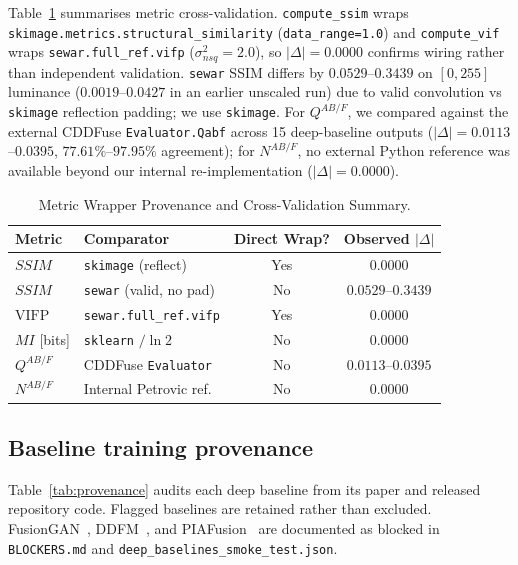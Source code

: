 \documentclass[conference]{IEEEtran}
\begin{document}
Table~\ref{tab:metrics_cv} summarises metric cross-validation. \texttt{compute\_ssim} wraps \texttt{skimage.metrics.structural\_similarity} (\texttt{data\_range=1.0}) and \texttt{compute\_vif} wraps \texttt{sewar.full\_ref.vifp} ($\sigma_{nsq}^2=2.0$), so $|\Delta|=0.0000$ confirms wiring rather than independent validation. \texttt{sewar} SSIM differs by $0.0529$--$0.3439$ on $[0,255]$ luminance ($0.0019$--$0.0427$ in an earlier unscaled run) due to valid convolution vs \texttt{skimage} reflection padding; we use \texttt{skimage}. For $Q^{AB/F}$, we compared against the external CDDFuse \texttt{Evaluator.Qabf} across 15 deep-baseline outputs ($|\Delta|=0.0113$--$0.0395$, $77.61\%$--$97.95\%$ agreement); for $N^{AB/F}$, no external Python reference was available beyond our internal re-implementation ($|\Delta|=0.0000$).

\begin{table}[htbp]
\caption{Metric Wrapper Provenance and Cross-Validation Summary.}
\label{tab:metrics_cv}
\centering
\begin{tabular}{llcc}
\toprule
\textbf{Metric} & \textbf{Comparator} & \textbf{Direct Wrap?} & \textbf{Observed $|\Delta|$} \\
\midrule
$SSIM$ & \texttt{skimage} (reflect) & Yes & $0.0000$ \\
$SSIM$ & \texttt{sewar} (valid, no pad) & No & $0.0529$--$0.3439$ \\
$\mathrm{VIFP}$ & \texttt{sewar.full\_ref.vifp} & Yes & $0.0000$ \\
$MI$ [bits] & \texttt{sklearn} $/ \ln 2$ & No & $0.0000$ \\
$Q^{AB/F}$ & CDDFuse \texttt{Evaluator} & No & $0.0113$--$0.0395$ \\
$N^{AB/F}$ & Internal Petrovic ref. & No & $0.0000$ \\
\bottomrule
\end{tabular}
\end{table}

\subsection{Baseline training provenance}
\label{sec:provenance}
Table~\ref{tab:provenance} audits each deep baseline from its paper and released repository code. Flagged baselines are retained rather than excluded. FusionGAN~\cite{ma2019fusiongan}, DDFM~\cite{zhao2023ddfm}, and PIAFusion~\cite{tang2022piafusion} are documented as blocked in \texttt{BLOCKERS.md} and \texttt{deep\_baselines\_smoke\_test.json}.
\end{document}
